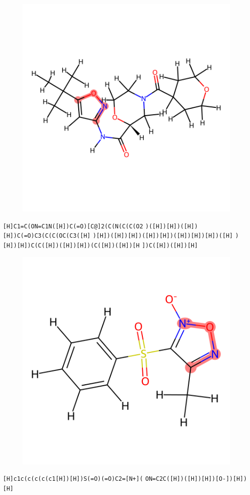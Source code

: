 \documentclass{article}
\begin{document}
\begin{figure}[ht]
\centering
    \includegraphics{mol136.png}
\end{figure}
\verb|[H]C1=C(ON=C1N([H])C(=O)[C@]2(C(N(C(C(O2| \verb|)([H])[H])([H])[H])C(=O)C3(C(C(OC(C3([H]| \verb|)[H])([H])[H])([H])[H])([H])[H])[H])([H]| \verb|)[H])[H])C(C([H])([H])[H])(C([H])([H])[H| \verb|])C([H])([H])[H]|

\begin{figure}[ht]
\centering
    \includegraphics{mol137.png}
\end{figure}
\verb|[H]c1c(c(c(c(c1[H])[H])S(=O)(=O)C2=[N+](| \verb|ON=C2C([H])([H])[H])[O-])[H])[H]|
\end{document}
